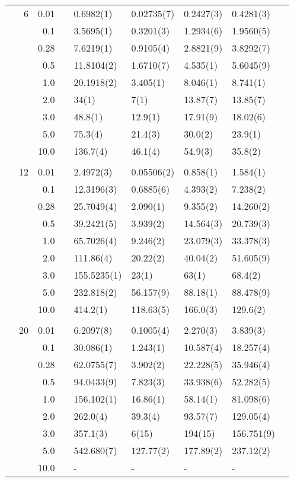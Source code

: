 \begin{table}[H]
\begin{tabularx}{\textwidth}{R{1cm}rrcR{2.3cm}R{2.3cm}R{2.3cm}R{2.3cm}R{1cm}}
		&6 & 0.01 && 0.6982(1) & 0.02735(7) & 0.2427(3) & 0.4281(3) \\
		&& 0.1 && 3.5695(1) & 0.3201(3) & 1.2934(6) & 1.9560(5) \\
		&& 0.28 && 7.6219(1) & 0.9105(4) & 2.8821(9) & 3.8292(7) \\
		&& 0.5 && 11.8104(2) & 1.6710(7) & 4.535(1) & 5.6045(9)\\
		&& 1.0 && 20.1918(2) & 3.405(1) & 8.046(1) & 8.741(1)\\
		&& 2.0 && 34(1) & 7(1) & 13.87(7) & 13.85(7) \\
		&& 3.0 && 48.8(1) & 12.9(1) & 17.91(9) & 18.02(6) \\ 
		&& 5.0 && 75.3(4) & 21.4(3) & 30.0(2) & 23.9(1) \\
		&& 10.0 && 136.7(4) & 46.1(4) & 54.9(3) & 35.8(2) \\
		\hdashline \\
		
		&12 & 0.01 && 2.4972(3) & 0.05506(2) & 0.858(1) & 1.584(1)\\
		&& 0.1 && 12.3196(3) & 0.6885(6) & 4.393(2) & 7.238(2) \\
		&& 0.28 && 25.7049(4) & 2.090(1) & 9.355(2) & 14.260(2) \\
		&& 0.5 && 39.2421(5) & 3.939(2) & 14.564(3) & 20.739(3) \\
		&& 1.0 && 65.7026(4) & 9.246(2) & 23.079(3) & 33.378(3) \\
		&& 2.0 && 111.86(4) & 20.22(2) & 40.04(2) & 51.605(9) \\
		&& 3.0 && 155.5235(1) & 23(1) & 63(1) & 68.4(2) \\ 
		&& 5.0 && 232.818(2) & 56.157(9) & 88.18(1) & 88.478(9) \\
		&& 10.0 && 414.2(1) & 118.63(5) & 166.0(3) & 129.6(2) \\
		\hdashline \\
		
		&20 & 0.01 && 6.2097(8) & 0.1005(4) & 2.270(3) & 3.839(3) \\
		&& 0.1 && 30.086(1) & 1.243(1) & 10.587(4) & 18.257(4) \\
		&& 0.28 && 62.0755(7) & 3.902(2) & 22.228(5) & 35.946(4) \\
		&& 0.5 && 94.0433(9) & 7.823(3) & 33.938(6) & 52.282(5) \\
		&& 1.0 && 156.102(1) & 16.86(1) & 58.14(1) & 81.098(6) \\
		&& 2.0 && 262.0(4) & 39.3(4) & 93.57(7) & 129.05(4) \\
		&& 3.0 && 357.1(3) & 6(15) & 194(15) & 156.751(9) \\ 
		&& 5.0 && 542.680(7) & 127.77(2) & 177.89(2) & 237.12(2) \\
		&& 10.0 && - & - & - & -\\
		\hline \hline
	\end{tabularx}
\end{table} 

